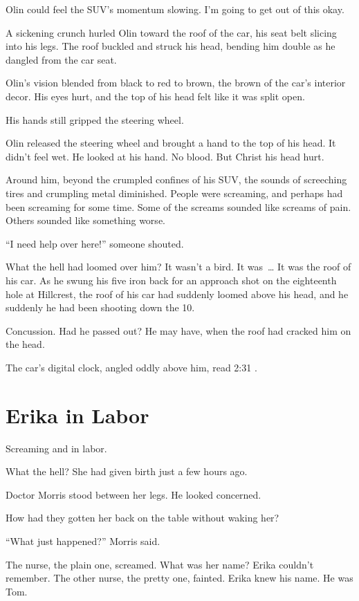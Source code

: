 Olin could feel the SUV’s momentum slowing. I’m going to get out of this okay.

A sickening crunch hurled Olin toward the roof of the car, his seat belt slicing into his legs. The roof buckled and struck his head, bending him double as he dangled from the car seat.

Olin’s vision blended from black to red to brown, the brown of the car’s interior decor. His eyes hurt, and the top of his head felt like it was split open.

His hands still gripped the steering wheel.

Olin released the steering wheel and brought a hand to the top of his head. It didn’t feel wet. He looked at his hand. No blood. But Christ his head hurt.

Around him, beyond the crumpled confines of his SUV, the sounds of screeching tires and crumpling metal diminished. People were screaming, and perhaps had been screaming for some time. Some of the screams sounded like screams of pain. Others sounded like something worse.

“I need help over here!” someone shouted.

What the hell had loomed over him? It wasn’t a bird. It was~… It was the roof of his car. As he swung his five iron back for an approach shot on the eighteenth hole at Hillcrest, the roof of his car had suddenly loomed above his head, and he suddenly he had been shooting down the 10.

Concussion. Had he passed out? He may have, when the roof had cracked him on the head.

The car’s digital clock, angled oddly above him, read 2:31 .



\chapter{Erika in Labor}

 Screaming and in labor.

What the hell? She had given birth just a few hours ago.

Doctor Morris stood between her legs. He looked concerned.

How had they gotten her back on the table without waking her?

“What just happened?” Morris said.

The nurse, the plain one, screamed. What was her name? Erika couldn’t remember. The other nurse, the pretty one, fainted. Erika knew his name. He was Tom.

